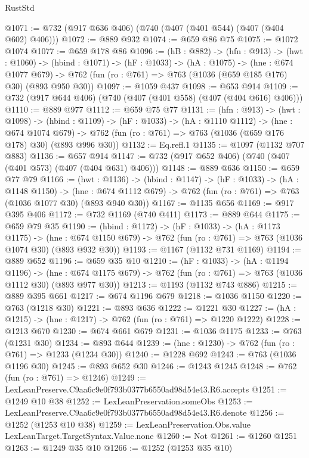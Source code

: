 \begin{lexlean}{RustStd}
\begin{coremodule}
@1071 := @732 (@917 @636 @406) (@740 (@407 (@401 @544) (@407 (@404 @602) @406)))
@1072 := @889 @932
@1074 := @659 @86 @75
@1075 := @1072 @1074
@1077 := @659 @178 @86
@1096 := (hB : @882) ->
  (hfn : @913) ->
  (hwt : @1060) ->
  (hbind : @1071) ->
  (hF : @1033) ->
  (hA : @1075) ->
  (hne : @674 @1077 @679) ->
  @762 (fun (ro : @761) => @763 (@1036 (@659 @185 @176) @30) (@893 @950 @30))
@1097 := @1059 @437
@1098 := @653 @914
@1109 := @732 (@917 @644 @406) (@740 (@407 (@401 @558) (@407 (@404 @616) @406)))
@1110 := @889 @977
@1112 := @659 @75 @77
@1131 := (hfn : @913) ->
  (hwt : @1098) ->
  (hbind : @1109) ->
  (hF : @1033) ->
  (hA : @1110 @1112) ->
  (hne : @674 @1074 @679) ->
  @762 (fun (ro : @761) => @763 (@1036 (@659 @176 @178) @30) (@893 @996 @30))
@1132 := Eq.refl.{1}
@1135 := @1097 (@1132 @707 @883)
@1136 := @657 @914
@1147 := @732 (@917 @652 @406) (@740 (@407 (@401 @573) (@407 (@404 @631) @406)))
@1148 := @889 @636
@1150 := @659 @77 @79
@1166 := (hwt : @1136) ->
  (hbind : @1147) ->
  (hF : @1033) ->
  (hA : @1148 @1150) ->
  (hne : @674 @1112 @679) -> @762 (fun (ro : @761) => @763 (@1036 @1077 @30) (@893 @940 @30))
@1167 := @1135 @656
@1169 := @917 @395 @406
@1172 := @732 @1169 (@740 @411)
@1173 := @889 @644
@1175 := @659 @79 @35
@1190 := (hbind : @1172) ->
  (hF : @1033) ->
  (hA : @1173 @1175) ->
  (hne : @674 @1150 @679) -> @762 (fun (ro : @761) => @763 (@1036 @1074 @30) (@893 @932 @30))
@1193 := @1167 (@1132 @731 @1169)
@1194 := @889 @652
@1196 := @659 @35 @10
@1210 := (hF : @1033) ->
  (hA : @1194 @1196) ->
  (hne : @674 @1175 @679) -> @762 (fun (ro : @761) => @763 (@1036 @1112 @30) (@893 @977 @30))
@1213 := @1193 (@1132 @743 @886)
@1215 := @889 @395 @661
@1217 := @674 @1196 @679
@1218 := @1036 @1150
@1220 := @763 (@1218 @30)
@1221 := @893 @636
@1222 := @1221 @30
@1227 := (hA : @1215) -> (hne : @1217) -> @762 (fun (ro : @761) => @1220 @1222)
@1228 := @1213 @670
@1230 := @674 @661 @679
@1231 := @1036 @1175
@1233 := @763 (@1231 @30)
@1234 := @893 @644
@1239 := (hne : @1230) -> @762 (fun (ro : @761) => @1233 (@1234 @30))
@1240 := @1228 @692
@1243 := @763 (@1036 @1196 @30)
@1245 := @893 @652 @30
@1246 := @1243 @1245
@1248 := @762 (fun (ro : @761) => @1246)
@1249 := LexLeanPreserve.C9aa6c9e0f793b0377b6550ad98d54e43.R6.accepts
@1251 := @1249 @10 @38
@1252 := LexLeanPreservation.someObs
@1253 := LexLeanPreserve.C9aa6c9e0f793b0377b6550ad98d54e43.R6.denote
@1256 := @1252 (@1253 @10 @38)
@1259 := LexLeanPreservation.Obs.value LexLeanTarget.TargetSyntax.Value.none
@1260 := Not
@1261 := @1260 @1251
@1263 := @1249 @35 @10
@1266 := @1252 (@1253 @35 @10)

\end{coremodule}
\end{lexlean}
